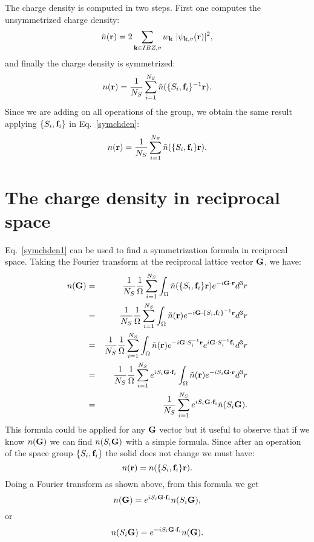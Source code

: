 \documentclass[12pt,a4paper,twoside]{report}
\begin{document}
The charge density is computed in two steps. First one computes the unsymmetrized charge density:
\begin{equation}
\tilde n({\bf r}) = 2 \sum_{{\bf k}\in IBZ , v} w_{\bf k}\ |\psi_{{\bf k}, v} ({\bf r}) |^2,
\label{unsymchden}
\end{equation}
and finally the charge density is symmetrized:
\begin{equation}
n({\bf r}) = {1 \over N_S} \sum_{i=1}^{N_S} \tilde n ( \{S_i,{\bf f}_i\}^{-1} {\bf r}).
\label{symchden}
\end{equation}
Since we are adding on all operations of the group, we obtain the same result applying $\{S_i,{\bf f}_i\}$ in Eq.~\ref{symchden}:
\begin{equation}
n({\bf r}) = {1 \over N_S} \sum_{i=1}^{N_S} \tilde n ( \{S_i,{\bf f}_i\} {\bf r}).
\label{symchden1}
\end{equation}

\section{The charge density in reciprocal space}
Eq.~\ref{symchden1} can be used to find a symmetrization formula in reciprocal space. Taking the Fourier transform at the reciprocal lattice vector ${\bf G}$, we have:
\begin{eqnarray}
n({\bf G}) &=& {1\over N_S} {1\over \Omega}
\sum_{i=1}^{N_S} \int_{\Omega} \tilde n ( \{S_i,{\bf f}_i\} {\bf r}) e^{-i{\bf G} \cdot {\bf r}} d^3r\nonumber \\
&=&{1\over N_S} {1\over \Omega}
\sum_{i=1}^{N_S} \int_{\Omega} \tilde n ({\bf r}) e^{-i{\bf G} \cdot \{S_i,{\bf f}_i\}^{-1}{\bf r}} d^3r \nonumber \\
&=&{1\over N_S} {1\over \Omega}
\sum_{i=1}^{N_S} \int_{\Omega} \tilde n ({\bf r}) e^{-i{\bf G} \cdot S_i^{-1}{\bf r}} e^{i{\bf G} \cdot S_i^{-1}{\bf f}_i} d^3r \nonumber \\
&=&{1\over N_S} {1\over \Omega}
\sum_{i=1}^{N_S} e^{iS_i {\bf G} \cdot {\bf f}_i} \int_{\Omega} \tilde n ({\bf r}) e^{-iS_i {\bf G} \cdot {\bf r}} d^3r \nonumber \\
&=&{1\over N_S}
\sum_{i=1}^{N_S} e^{iS_i {\bf G} \cdot {\bf f}_i}  \tilde n (S_i{\bf G}). 
\label{symng}
\end{eqnarray}
This formula could be applied for any ${\bf G}$ vector but it useful to observe that if we know $n({\bf G})$ we can find
$n(S_i{\bf G})$ with a simple formula.
Since after an operation of the space group $\{S_i,{\bf f}_i\}$ the solid does not change we must have:
\begin{equation}
n({\bf r})=n(\{S_i,{\bf f}_i\}{\bf r}).
\end{equation}
Doing a Fourier transform as shown above, from this formula we get
\begin{equation}
 n({\bf G})= e^{iS_i {\bf G} \cdot {\bf f}_i} n (S_i{\bf G}), 
\end{equation}
or 
\begin{equation}
 n(S_i{\bf G})= e^{-iS_i {\bf G} \cdot {\bf f}_i} n ({\bf G}). 
 \label{ngdist}
\end{equation}
\end{document}
